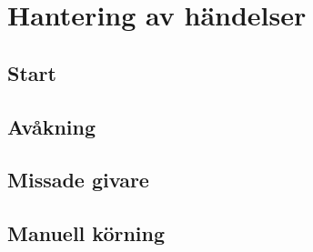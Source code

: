 \section{Hantering av händelser}

\subsection{Start} 

\subsection{Avåkning} 

\subsection{Missade givare} 

\subsection{Manuell körning} 

